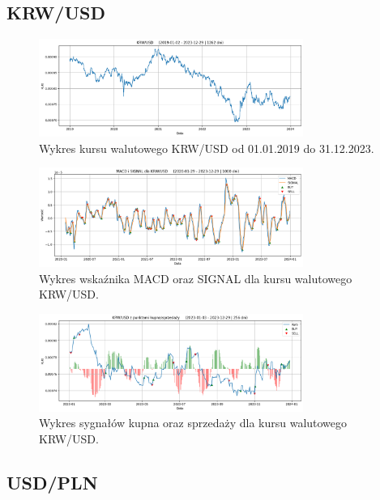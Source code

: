 \documentclass[12pt, a4paper]{article}
\begin{document}
\subsection{KRW/USD}

\begin{figure}[ht]
    \centering
    \includegraphics[width=0.77\textwidth]{krw_usd_value.png}
    \caption{Wykres kursu walutowego KRW/USD od 01.01.2019 do 31.12.2023.}
    \label{fig:all:krw_usd_value}
\end{figure}
\begin{figure}[ht]
    \centering
    \includegraphics[width=0.77\textwidth]{krw_usd_macd_signal.png}
    \caption{Wykres wskaźnika MACD oraz SIGNAL dla kursu walutowego KRW/USD.}
    \label{fig:all:krw_usd_macd_signal}
\end{figure}
\begin{figure}[ht]
    \centering
    \includegraphics[width=0.77\textwidth]{krw_usd_value_buy_sell.png}
    \caption{Wykres sygnałów kupna oraz sprzedaży dla kursu walutowego KRW/USD.}
    \label{fig:all:krw_usd_value_buy_sell}
\end{figure}

\pagebreak






\subsection{USD/PLN}
\end{document}
